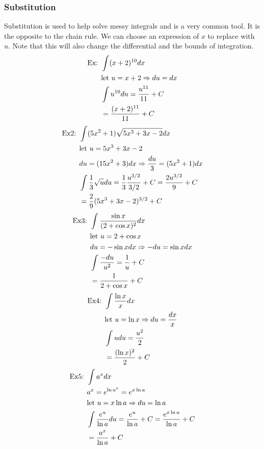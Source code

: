 \documentclass[11pt, fleqn]{article}
\begin{document}
\subsubsection{Substitution}
Substitution is used to help solve messy integrals and is a very common tool. It is the opposite to the chain rule. We can choose an expression of $x$ to replace with $u$. Note that this will also change the differential and the bounds of integration.
\begin{align*}
    \text{Ex: }&\int (x+2)^{10}dx\\
    &\text{let }u=x+2\Rightarrow du=dx\\
    &\int u^{10}du=\frac{u^{11}}{11}+C\\
    &=\frac{(x+2)^{11}}{11}+C
\end{align*}
\begin{align*}
    \text{Ex2: }&\int(5x^2+1)\sqrt{5x^3+3x-2}dx\\
    &\text{let }u=5x^3+3x-2\\
    &du=(15x^2+3)dx\Rightarrow\frac{du}{3}=(5x^2+1)dx\\
    &\int \frac{1}{3}\sqrt{u}du=\frac{1}{3}\frac{u^{3/2}}{3/2}+C=\frac{2u^{3/2}}{9}+C\\
    &=\frac{2}{9}(5x^3+3x-2)^{3/2}+C
\end{align*}
\begin{align*}
    \text{Ex3: }&\int \frac{\sin x}{(2+\cos x)^2}dx\\
    &\text{let }u=2+\cos x\\
    &du=-\sin x dx\Rightarrow-du=\sin x dx\\
    &\int\frac{-du}{u^2}=\frac{1}{u}+C\\
    &=\frac{1}{2+\cos x}+C
\end{align*}
\begin{align*}
    \text{Ex4: }&\int\frac{\ln x}{x}dx\\
    &\text{let }u=\ln x\Rightarrow du=\frac{dx}{x}\\
    &\int udu=\frac{u^2}{2}\\
    &=\frac{(\ln x)^2}{2}+C
\end{align*}
\begin{align*}
    \text{Ex5: }&\int a^xdx\\
    &a^x=e^{\ln a^x}=e^{x\ln a}\\
    &\text{let }u=x\ln a\Rightarrow du=\ln a\\
    &\int \frac{e^{u}}{\ln a}du=\frac{e^u}{\ln a}+C=\frac{e^{x\ln a}}{\ln a}+C\\
    &=\frac{a^x}{\ln a}+C
\end{align*}
\end{document}
